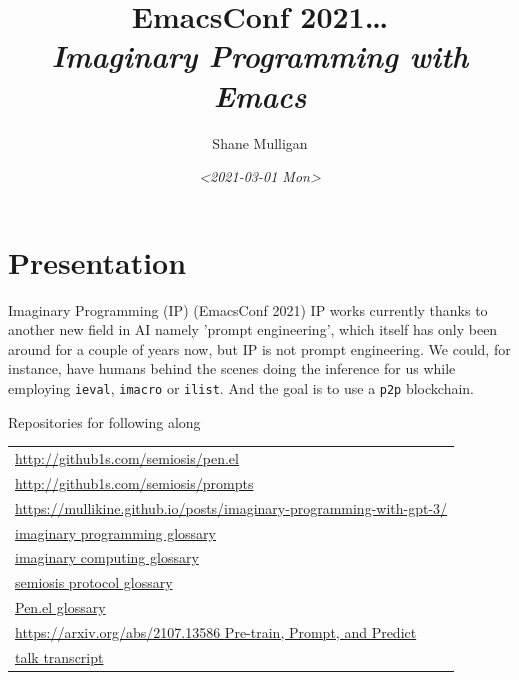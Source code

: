 \documentclass[presentation]{beamer}
\author{Shane Mulligan \\  }
\date{\textit{<2021-03-01 Mon>}}
\title{EmacsConf 2021\ldots{} \\   \emph{\alert{Imaginary Programming with Emacs}} \\  }
\begin{document}
\maketitle

\section{Presentation}
\label{sec:org47b129c}
\begin{frame}[label={sec:orgea1946b},fragile]{Imaginary Programming (IP) (EmacsConf 2021)}
 {\tiny
IP works currently thanks to another new field in AI
namely 'prompt engineering', which itself has
only been around for a couple of years now,
but IP is not prompt engineering. We could,
for instance, have humans behind the scenes
doing the inference for us while employing
\texttt{ieval}, \texttt{imacro} or \texttt{ilist}. And the goal is
to use a \texttt{p2p} blockchain.
}

\begin{block}{Repositories for following along}
{\tiny
\begin{center}
\begin{tabular}{l}
\url{http://github1s.com/semiosis/pen.el}\\
\url{http://github1s.com/semiosis/prompts}\\
\url{https://mullikine.github.io/posts/imaginary-programming-with-gpt-3/}\\
\href{http://github.com/semiosis/glossaries-gh/blob/master/imaginary-programming.txt}{imaginary programming glossary}\\
\href{http://github.com/semiosis/glossaries-gh/blob/master/imaginary-computing.txt}{imaginary computing glossary}\\
\href{http://github.com/semiosis/glossaries-gh/blob/master/semiosis-protocol.txt}{semiosis protocol glossary}\\
\href{http://github.com/semiosis/glossaries-gh/blob/master/pen.el.txt}{Pen.el glossary}\\
\href{https://arxiv.org/abs/2107.13586}{https://arxiv.org/abs/2107.13586 Pre-train, Prompt, and Predict}\\
\href{http://github1s.com/mullikine/imaginary-programming-transcript-emacsconf-2021}{talk transcript}\\
\end{tabular}
\end{center}
}
\end{block}
\end{frame}
\end{document}
